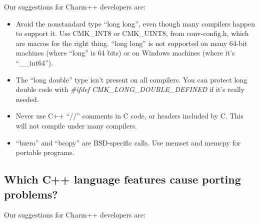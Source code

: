 Our suggestions for Charm++ developers are:

\begin{itemize}
\item Avoid the nonstandard type ``long long'', even though many compilers
happen to support it.  Use CMK\_INT8 or CMK\_UINT8,
from conv-config.h, which are macros for the right thing.
``long long'' is not supported on many 64-bit machines (where ``long''
is 64 bits) or on Windows machines (where it's ``\_\_int64'').
\item The ``long double'' type isn't present on all compilers.  You can protect
long double code with {\em \#ifdef CMK\_LONG\_DOUBLE\_DEFINED} if it's really needed.
\item Never use C++ ``//'' comments in C code, or headers included by C.
This will not compile under many compilers. %
\item ``bzero'' and ``bcopy'' are BSD-specific calls.  
Use memset and memcpy for portable programs.
\end{itemize}

\subsection{Which C++ language features cause porting problems?}

Our suggestions for Charm++ developers are:

